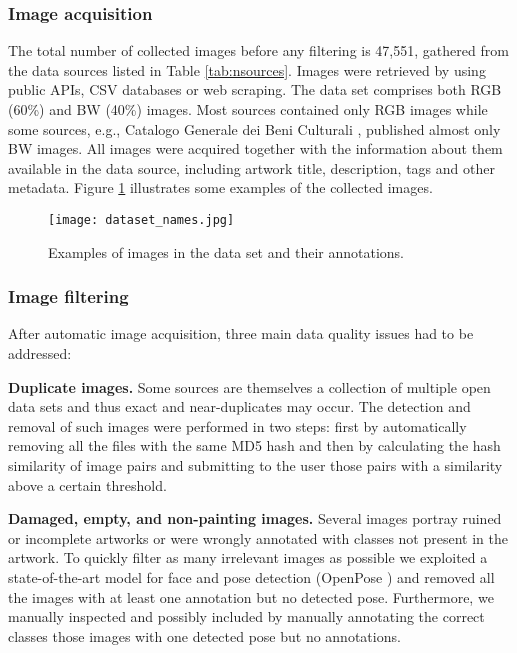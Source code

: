 \documentclass[acmlarge]{acmart}
\begin{document}
\subsubsection{Image acquisition}


The total number of collected images before any filtering is 47,551, gathered from the data sources listed in  Table \ref{tab:nsources}. Images were retrieved by using public APIs, CSV databases or web scraping.   The data set comprises both RGB (60\%) and BW (40\%) images. Most   sources contained only RGB images while some sources, e.g., Catalogo Generale dei Beni Culturali \cite{benicult}, published almost only BW images.
All images were acquired together with the information about them available in the data source, including artwork title, description, tags and other metadata.
Figure \ref{figure:sampleimages} illustrates some examples of the collected images. 



\begin{figure}[t]
    \centering
    \texttt{[image: dataset\_names.jpg]}
    \caption{Examples of images in the data set and their annotations.}
    \label{figure:sampleimages}
\end{figure}

\subsubsection{Image filtering} After  automatic image acquisition, three main data quality issues had to be addressed:

\textbf{Duplicate images.} Some sources are themselves a collection of multiple open data sets and thus  exact and near-duplicates may occur.  The detection and removal of such images were performed in two steps: first by automatically removing all the files with the same MD5 hash and then by calculating the hash similarity of image pairs and submitting to the user those pairs with a similarity above a certain threshold.  

\textbf{Damaged, empty, and non-painting images.} Several images portray ruined  or incomplete artworks or were wrongly annotated with  classes not present in the artwork. To quickly filter as many irrelevant  images as possible we exploited a state-of-the-art model for face and pose detection  (OpenPose \cite{8765346}) and removed all the images with at least one annotation but no detected  pose. Furthermore, we manually inspected  and possibly included by manually annotating the correct classes those images with  one detected pose but no annotations.
\end{document}

